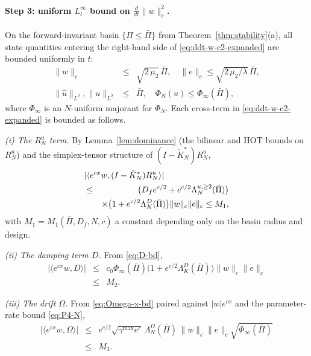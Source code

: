 \documentclass[journal,twoside,web]{ieeecolor}
\begin{document}
\paragraph{Step 3: uniform $L^\infty_t$ bound on $\frac{d}{dt}\|w\|_c^2$.}
On the forward-invariant basin $\{\Pi\le\bar\Pi\}$ from Theorem~\ref{thm:stability}(a), all state quantities entering the right-hand side of \eqref{eq:ddt-w-c2-expanded} are bounded uniformly in $t$:
\begin{eqnarray}
\|w\|_c &\le& \sqrt{2\,\mu_2}\,\bar\Pi,\quad \|e\|_c\le\sqrt{2\,\mu_2/\lambda}\,\bar\Pi, \nonumber\\
\|\hat u\|_{L^2},\|u\|_{L^2} &\le& \bar\Pi,\quad \Phi_N(u)\le\Phi_\infty(\bar\Pi), \label{eq:basin-bounds}
\end{eqnarray}
where $\Phi_\infty$ is an $N$-uniform majorant for $\Phi_N$. Each cross-term in \eqref{eq:ddt-w-c2-expanded} is bounded as follows.

\emph{(i) The $R^u_N$ term.} By Lemma~\ref{lem:dominance} (the bilinear and HOT bounds on $R^u_N$) and the simplex-tensor structure of $(I-\check K_N^*)R^u_N$,
\begin{eqnarray}
\lefteqn{|\langle e^{cx}w,(I-\check K_N^*)R^u_N\rangle|} \nonumber\\
&\le& \bigl(D_f e^{c/2}+e^{c/2}\Lambda^{u,\ge 2}_N(\bar\Pi)\bigr) \nonumber\\
&& \times\bigl(1+e^{c/2}\Lambda^D_K(\bar\Pi)\bigr)\|w\|_c\|e\|_c\le M_1, \label{eq:ddt-Ru-bd}
\end{eqnarray}
with $M_1=M_1(\bar\Pi,D_f,N,c)$ a constant depending only on the basin radius and design.

\emph{(ii) The damping term $D$.} From \eqref{eq:D-bd},
\begin{eqnarray}
|\langle e^{cx}w,D\rangle| &\le& c_0\Phi_\infty(\bar\Pi)\bigl(1+e^{c/2}\Lambda^D_K(\bar\Pi)\bigr)\|w\|_c\|e\|_c \nonumber\\
&\le& M_2. \label{eq:ddt-D-bd}
\end{eqnarray}

\emph{(iii) The drift $\Omega$.} From \eqref{eq:Omega-x-bd} paired against $|w|e^{cx}$ and the parameter-rate bound \eqref{eq:P4-N},
\begin{eqnarray}
|\langle e^{cx}w,\Omega\rangle| &\le& e^{c/2}\sqrt{\gamma^{\max}e^c}\,\Lambda^\Omega_N(\bar\Pi)\,\|w\|_c\|e\|_c\sqrt{\Phi_\infty(\bar\Pi)} \nonumber\\
&\le& M_3. \label{eq:ddt-Omega-bd}
\end{eqnarray}
\end{document}
